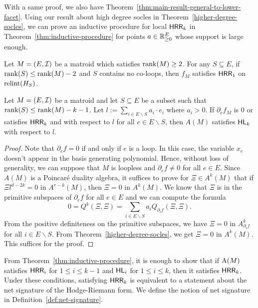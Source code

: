 \documentclass{puthesis-UG}
\begin{document}
With a same proof, we also have Theorem~\ref{thm:main-result-general-to-lower-facet}. Using our result about high degree socles in Theorem~\ref{higher-degree-socles}, we can prove an inductive procedure for local $\mathsf{HRR}_k$ in Theorem~\ref{thm:inductive-procedure} for points $a \in \mathbb{R}_{\geq 0}^E$ whose support is large enough. 

\begin{thm} \label{thm:main-result-general-to-lower-facet}
	Let $M = (E, \mathcal{I})$ be a matroid which satisfies $\operatorname{rank} (M) \geq 2$. For any $S \subseteq E$, if $\operatorname{rank}(S) \leq \operatorname{rank} (M) - 2$ and $S$ contains no co-loops, then $f_M$ satisfies $\mathsf{HRR}_1$ on $\operatorname{relint} (H_S)$. 
\end{thm}

\begin{thm} \label{thm:inductive-procedure}
	Let $M = (E, \mathcal{I})$ be a matroid and let $S \subseteq E$ be a subset such that $\operatorname{rank} (S) \leq \operatorname{rank} (M) - k - 1$. Let $l := \sum_{i \in E \backslash S} a_i \cdot e_i$ where $a_i > 0$. If $\partial_e f_M$ is $0$ or satisfies $\mathsf{HRR}_k$ and with respect to $l$ for all $e \in E \backslash S$, then $A(M)$ satisfies $\mathsf{HL}_k$ with respect to $l$. 
\end{thm}

\begin{proof}
	Note that $\partial_e f = 0$ if and only if $e$ is a loop. In this case, the variable $x_e$ doesn't appear in the basis generating polynomial. Hence, without loss of generality, we can suppose that $M$ is loopless and $\partial_e f \neq 0$ for all $e \in E$. Since $A(M)$ is a Poincar\'e duality algebra, it suffices to prove for $\Xi \in A^k(M)$ that if $\Xi l^{d-2k} = 0$ in $A^{r-k}(M)$, then $\Xi = 0$ in $A^k(M)$. We know that $\Xi$ is in the primitive subspaces of $\partial_e f$ for all $e \in E$ and we can compute the formula
	\[
		0 = Q^k (\Xi, \Xi) = \sum_{i \in E \backslash S} a_i Q_{\partial_i f} (\Xi, \Xi).
	\]
	From the positive definiteness on the primitive subspaces, we have $\Xi = 0$ in $A^k_{\partial_i f}$ for all $i \in E\backslash S$. From Theorem~\ref{higher-degree-socles}, we get $\Xi = 0$ in $A^k(M)$. This suffices for the proof. 
\end{proof}

From Theorem~\ref{thm:inductive-procedure}, it is enough to show that if $\operatorname{A}(M)$ satisfies $\mathsf{HRR}_i$ for $1 \leq i \leq k-1$ and $\mathsf{HL}_i$ for $1 \leq i \leq k$, then it satisfies $\mathsf{HRR}_k$. Under these conditions, satisfying $\mathsf{HRR}_k$ is equivalent to a statement about the net signature of the Hodge-Riemann form. We define the notion of net signature in Definition~\ref{def:net-signature}. 
\end{document}
